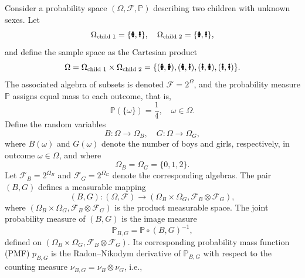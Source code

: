\newpage
\begin{example}
	Consider a probability space $(\Omega, \mathcal{F}, \mathbb{P})$ describing two children with unknown sexes. Let
	\begin{equation}
		\Omega_{\text{child 1}} = \{\text{\Gentsroom}, \text{\Ladiesroom}\}, \quad
		\Omega_{\text{child 2}} = \{\text{\Gentsroom}, \text{\Ladiesroom}\},
	\end{equation}
	and define the sample space as the Cartesian product
	\begin{equation}
		\Omega = \Omega_{\text{child 1}} \times \Omega_{\text{child 2}} =
		\{(\text{\Gentsroom},\text{\Gentsroom}), (\text{\Gentsroom},\text{\Ladiesroom}), (\text{\Ladiesroom},\text{\Gentsroom}), (\text{\Ladiesroom},\text{\Ladiesroom})\}.
	\end{equation}
	The associated algebra of subsets is denoted $\mathcal{F} = 2^{\Omega}$, and the probability measure $\mathbb{P}$ assigns equal mass to each outcome, that is,
	\begin{equation}
		\mathbb{P}(\{\omega\}) = \frac{1}{4}, \quad \omega \in \Omega.
	\end{equation}
	Define the random variables
	\begin{equation}
		B \colon \Omega \to \Omega_B, \quad G \colon \Omega \to \Omega_G,
	\end{equation}
	where $B(\omega)$ and $G(\omega)$ denote the number of boys and girls, respectively, in outcome $\omega \in \Omega$, and where
	\begin{equation}
		\Omega_B = \Omega_G = \{0,1,2\}.
	\end{equation}
	Let $\mathcal{F}_B = 2^{\Omega_B}$ and $\mathcal{F}_G = 2^{\Omega_G}$ denote the corresponding algebras. The pair $(B,G)$ defines a measurable mapping
	\begin{equation}
		(B,G)\colon (\Omega, \mathcal{F}) \to (\Omega_B \times \Omega_G, \mathcal{F}_B \otimes \mathcal{F}_G),
	\end{equation}
	where $(\Omega_B \times \Omega_G, \mathcal{F}_B \otimes \mathcal{F}_G)$ is the product measurable space.	The joint probability measure of $(B,G)$ is the image measure
	\begin{equation}
		\mathbb{P}_{B,G} = \mathbb{P} \circ (B,G)^{-1},
	\end{equation}
	defined on $(\Omega_B \times \Omega_G, \mathcal{F}_B \otimes \mathcal{F}_G)$.
	Its corresponding probability mass function (PMF) $p_{B,G}$ is the Radon–Nikodym derivative of $\mathbb{P}_{B,G}$ with respect to the counting measure $\nu_{B,G} = \nu_B \otimes \nu_G$, i.e.,

\end{example}
